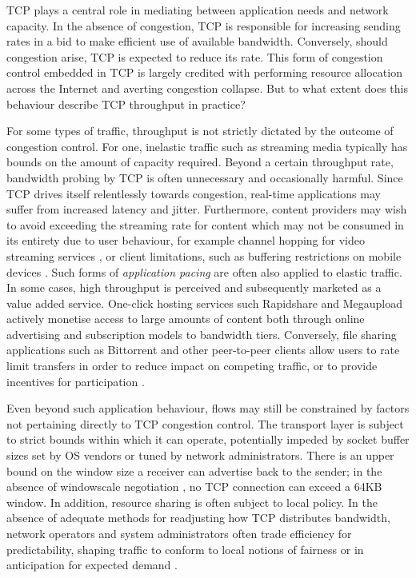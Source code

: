 \ac{TCP} plays a central role in mediating between application needs and network capacity.
In the absence of congestion, \ac{TCP} is responsible for increasing sending rates in a bid to make efficient use of available bandwidth.
Conversely, should congestion arise, \ac{TCP} is expected to reduce its rate.
This form of congestion control embedded in \ac{TCP} is largely credited with performing resource allocation across the Internet and averting congestion collapse.
But to what extent does this behaviour describe \ac{TCP} throughput in practice?

For some types of traffic, throughput is not strictly dictated by the outcome of congestion control.
For one, inelastic traffic such as streaming media typically has bounds on the amount of capacity required.
Beyond a certain throughput rate, bandwidth probing by \ac{TCP} is often unnecessary and occasionally harmful.
Since \ac{TCP} drives itself relentlessly towards congestion, real-time applications may suffer from increased latency and jitter.
Furthermore, content providers may wish to avoid exceeding the streaming rate for content which may not be consumed in its entirety due to user behaviour, for example channel hopping for video streaming services \cite{iptvWorkload}, or client limitations, such as buffering restrictions on mobile devices \cite{Rao:2011p547}.
Such forms of \emph{application pacing} are often also applied to elastic traffic.
In some cases, high throughput is perceived and subsequently marketed as a value added service.
One-click hosting services such Rapidshare and Megaupload \cite{oneclick1, SanjuasCuxart:2012p588} actively monetise access to large amounts of content both through online advertising and subscription models to bandwidth tiers.
Conversely, file sharing applications such as Bittorrent and other peer-to-peer clients allow users to rate limit transfers in order to reduce impact on competing traffic, or to provide incentives for participation \cite{bittorrentIMC}.

Even beyond such application behaviour, flows may still be constrained by factors not pertaining directly to \ac{TCP} congestion control.
The transport layer is subject to strict bounds within which it can operate, potentially impeded by socket buffer sizes set by \acf{OS} vendors or tuned by network administrators. 
There is an upper bound on the window size a receiver can advertise back to the sender; in the absence of windowscale negotiation \cite{braden1989rfc}, no \ac{TCP} connection can exceed a 64KB window. 
In addition, resource sharing is often subject to local policy.
In the absence of adequate methods for readjusting how \ac{TCP} distributes bandwidth, network operators and system administrators often trade efficiency for predictability, shaping traffic to conform to local notions of fairness or in anticipation for expected demand \cite{ispTrafficShaping}.

